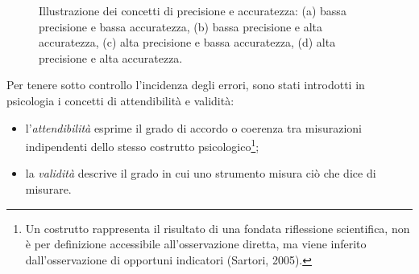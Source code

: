 \begin{figure}
\centering


\caption{Illustrazione dei concetti di precisione e accuratezza: (a) bassa precisione e bassa accuratezza, (b) bassa precisione e alta accuratezza, (c) alta precisione e bassa accuratezza, (d) alta precisione e alta accuratezza.}
    \label{fig:precisione_accuratezza}
\end{figure}

Per tenere sotto controllo l'incidenza degli errori, sono stati introdotti in psicologia i concetti di attendibilità e validità:
\begin{itemize}
\item l'\emph{attendibilità} esprime il grado  di  accordo  o  coerenza  tra misurazioni indipendenti dello stesso costrutto psicologico\footnote{Un costrutto rappresenta il risultato di una fondata riflessione scientifica, non è per definizione accessibile all'osservazione diretta, ma viene inferito dall'osservazione di opportuni indicatori (Sartori, 2005).};
\item la \emph{validità} descrive il grado  in  cui  uno  strumento  misura  ciò che dice di misurare.
\end{itemize}


